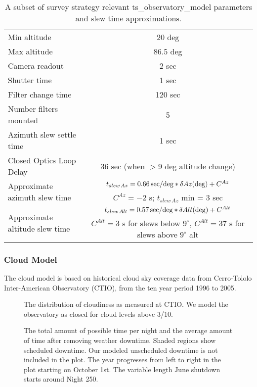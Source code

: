 \begin{table}[b]
\begin{centering}
\begin{tabular}{lc}
\toprule
Min altitude  & 20 deg \\
Max altitude & 86.5 deg \\
Camera readout & 2 sec\\
Shutter time & 1 sec \\
Filter change time & 120 sec \\
Number filters mounted & 5 \\
Azimuth slew settle time & 1 sec \\
Closed Optics Loop Delay & 36 sec (when $>9$ deg altitude change) \\
\multirow{2}{*}{Approximate azimuth slew time} &   $ t_{slew \, Az} = 0.66 \, {\rm sec/deg} * \delta Az ({\rm deg}) + C^{Az} $  \\
   &   $C^{Az} = -2$ s;   $t_{slew \, Az}$  min = 3 sec \\
\multirow{2}{*}{Approximate altitude slew time}  &  $  t_{slew \, Alt} = 0.57 \, {\rm sec/deg} * \delta Alt ({\rm deg}) + C^{Alt} $ \\
   & $C^{Alt} = 3$ s for slews below $9^\circ$, $C^{Alt} = 37$ s for slews above $9^\circ$ alt \\
\hline
\end{tabular}
\caption{A subset of survey strategy relevant ts\_observatory\_model parameters and slew time approximations.}
\label{tab:tsModel}
\end{centering}
\end{table}

\subsubsection{Cloud Model}

The cloud model is based on historical cloud sky coverage data from Cerro-Tololo Inter-American Observatory (CTIO), from the ten year period 1996 to 2005. 

\begin{figure}
\caption{The distribution of cloudiness as measured at CTIO. We model the observatory as closed for cloud levels above 3/10.}
\end{figure}

\begin{figure}
\caption{The total amount of possible time per night and the average amount of time after removing weather downtime. Shaded regions show scheduled downtime. Our modeled unscheduled downtime is not included in the plot. The year progresses from left to right in the plot starting on October 1st. The variable length June shutdown starts around Night 250.}
\end{figure}

